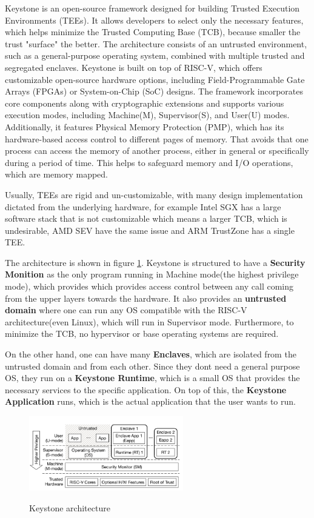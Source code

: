 Keystone is an open-source framework designed for building Trusted
Execution Environments (TEEs). It allows developers to select only the
necessary features, which helps minimize the Trusted Computing Base
(TCB), because smaller the trust "surface" the better. The
architecture consists of an untrusted environment, such as a
general-purpose operating system, combined with multiple trusted and
segregated enclaves. Keystone is built on top of RISC-V, which offers
customizable open-source hardware options, including
Field-Programmable Gate Arrays (FPGAs) or System-on-Chip (SoC)
designs. The framework incorporates core components along with
cryptographic extensions and supports various execution modes,
including Machine(M), Supervisor(S), and User(U) modes. Additionally, it
features Physical Memory Protection (PMP), which has its
hardware-based access control to different pages of memory. That
avoids that one process can access the memory of another process,
either in general or specifically during a period of time. This helps
to safeguard memory and I/O operations, which are memory mapped.

Usually, TEEs are rigid and un-customizable, with many design
implementation dictated from the underlying hardware, for example
Intel SGX has a large software stack that is not customizable which
means a larger TCB, which is undesirable, AMD SEV
have the same issue and ARM TrustZone has a single TEE. 

The architecture is shown in figure \ref{fig:keystone}. Keystone is
structured to have a \textbf{Security Monition} as the only program
running in Machine mode(the highest privilege mode), which provides
which provides access control between any call coming from the upper
layers towards the hardware. It also provides an \textbf{untrusted
domain} where one can run any OS compatible with the RISC-V 
architecture(even Linux), which will run in Supervisor mode. 
Furthermore, to minimize the TCB, no hypervisor or base operating
systems are required.

On the other hand, one can have many \textbf{Enclaves}, which are 
isolated from the untrusted domain and from each other. Since they
dont need a general purpose OS, they run on a \textbf{Keystone 
Runtime}, which is a small OS that provides the necessary services 
to the specific application. On top of this, the \textbf{Keystone 
Application} runs, which is the actual application that the user 
wants to run.

\begin{figure}[H]
  \centering
  \includegraphics[width=0.6\textwidth]{img/keystone architecture.png}
  \label{fig:keystone}
  \caption{Keystone architecture}
\end{figure}

